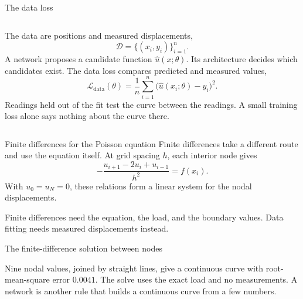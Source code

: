 \documentclass[aspectratio=169]{beamer}
\begin{document}
\begin{frame}{The data loss}
\begin{columns}[T]
The data are positions and measured displacements,
\[
\mathcal D=\{(x_i,y_i)\}_{i=1}^{n}.
\]
A network proposes a candidate function $\hat u(x;\theta)$.
Its architecture decides which candidates exist.
The data loss compares predicted and measured values,
\[
\mathcal L_{\text{data}}(\theta)
=\frac1n\sum_{i=1}^{n}\bigl(\hat u(x_i;\theta)-y_i\bigr)^2.
\]
Readings held out of the fit test the curve between the readings.
A small training loss alone says nothing about the curve there.
\end{columns}
\end{frame}

\begin{frame}{Finite differences for the Poisson equation}
Finite differences take a different route and use the equation itself.
At grid spacing $h$, each interior node gives
\[
-\frac{u_{i+1}-2u_i+u_{i-1}}{h^2}=f(x_i).
\]
With $u_0=u_N=0$, these relations form a linear system for the nodal displacements.
\bigskip

Finite differences need the equation, the load, and the boundary values.
Data fitting needs measured displacements instead.
\end{frame}

\begin{frame}{The finite-difference solution between nodes}
\begin{center}
\end{center}
Nine nodal values, joined by straight lines, give a continuous curve with root-mean-square error $0.0041$.
The solve uses the exact load and no measurements.
A network is another rule that builds a continuous curve from a few numbers.
\end{frame}

\end{document}
